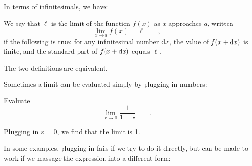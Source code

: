 In terms of infinitesimals, we have:
\begin{important}
We say that $\ell$ is the limit of the function $f(x)$ as $x$ approaches $a$, written
\begin{equation*}
  \lim_{x\rightarrow a} f(x) = \ell \qquad ,
\end{equation*}
if the following is true: for any infinitesimal number $\textup{d} x$, 
the value of $f(x+\textup{d} x)$ is finite, and the standard
part of $f(x+\textup{d} x)$ equals $\ell$.
\end{important}

The two definitions are equivalent.

Sometimes a limit can be evaluated simply by plugging in numbers:

\begin{eg}
\egquestion Evaluate
\begin{equation*}
  \lim_{x\rightarrow 0} \frac{1}{1+x} \qquad .
\end{equation*}

\eganswer Plugging in $x=0$, we find that the limit is 1.
\end{eg}

In some examples, plugging in fails if we try to do it directly, but
can be made to work if we massage the expression into a different form:

